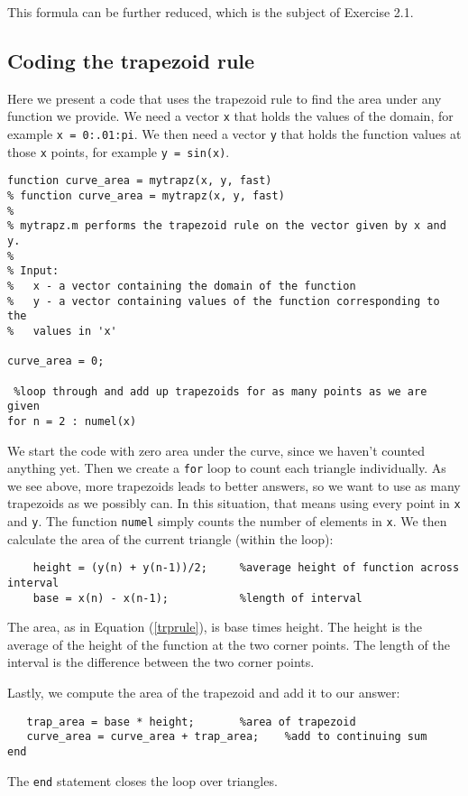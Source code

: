 \documentclass{article}
\begin{document}
This formula can be further reduced, which is the subject of Exercise 2.1.  

\subsection{Coding the trapezoid rule}
Here we present a code that uses the trapezoid rule to find the area under any function we provide.  We need a vector {\tt x} that holds the values of the domain, for example {\tt x = 0:.01:pi}.  We then need a vector {\tt y} that holds the function values at those {\tt x} points, for example {\tt y = sin(x)}.  

\begin{verbatim}
function curve_area = mytrapz(x, y, fast)
% function curve_area = mytrapz(x, y, fast)
%
% mytrapz.m performs the trapezoid rule on the vector given by x and y.
%
% Input:
%   x - a vector containing the domain of the function
%   y - a vector containing values of the function corresponding to the
%   values in 'x'

curve_area = 0;
    
 %loop through and add up trapezoids for as many points as we are given
for n = 2 : numel(x)
\end{verbatim}

We start the code with zero area under the curve, since we haven't counted anything yet.  Then we create a {\tt for} loop to count each triangle individually.  As we see above, more trapezoids leads to better answers, so we want to use as many trapezoids as we possibly can.  In this situation, that means using every point in {\tt x} and {\tt y}.  The function {\tt numel} simply counts the number of elements in {\tt x}.  We then calculate the area of the current triangle (within the loop):

\begin{verbatim}
    height = (y(n) + y(n-1))/2;     %average height of function across interval
    base = x(n) - x(n-1);      	    %length of interval
\end{verbatim}
The area, as in Equation (\ref{trprule}), is base times height.  The height is the average of the height of the function at the two corner points.  The length of the interval is the difference between the two corner points.

Lastly, we compute the area of the trapezoid and add it to our answer:
\begin{verbatim}
   trap_area = base * height; 	    %area of trapezoid
   curve_area = curve_area + trap_area;    %add to continuing sum
end
\end{verbatim}
The {\tt end} statement closes the loop over triangles.\\
\end{document}
